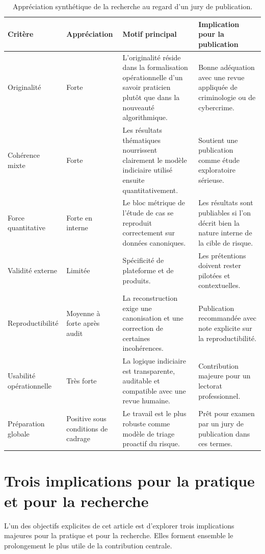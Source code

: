 \documentclass[10pt,a4paper]{article}
\begin{document}
\begin{table}[H]
\centering
\caption{Appréciation synthétique de la recherche au regard d'un jury de publication.}
\begin{tabularx}{\textwidth}{p{2.9cm} p{2.2cm} Y Y}
\toprule
\textbf{Critère} & \textbf{Appréciation} & \textbf{Motif principal} & \textbf{Implication pour la publication} \\
\midrule
Originalité & Forte & L'originalité réside dans la formalisation opérationnelle d'un savoir praticien plutôt que dans la nouveauté algorithmique. & Bonne adéquation avec une revue appliquée de criminologie ou de cybercrime. \\
Cohérence mixte & Forte & Les résultats thématiques nourrissent clairement le modèle indiciaire utilisé ensuite quantitativement. & Soutient une publication comme étude exploratoire sérieuse. \\
Force quantitative & Forte en interne & Le bloc métrique de l'étude de cas se reproduit correctement sur données canoniques. & Les résultats sont publiables si l'on décrit bien la nature interne de la cible de risque. \\
Validité externe & Limitée & Spécificité de plateforme et de produits. & Les prétentions doivent rester pilotées et contextuelles. \\
Reproductibilité & Moyenne à forte après audit & La reconstruction exige une canonisation et une correction de certaines incohérences. & Publication recommandée avec note explicite sur la reproductibilité. \\
Usabilité opérationnelle & Très forte & La logique indiciaire est transparente, auditable et compatible avec une revue humaine. & Contribution majeure pour un lectorat professionnel. \\
Préparation globale & Positive sous conditions de cadrage & Le travail est le plus robuste comme modèle de triage proactif du risque. & Prêt pour examen par un jury de publication dans ces termes. \\
\bottomrule
\end{tabularx}
\end{table}

\section{Trois implications pour la pratique et pour la recherche}
L'un des objectifs explicites de cet article est d'explorer trois implications majeures pour la pratique et pour la recherche. Elles forment ensemble le prolongement le plus utile de la contribution centrale.
\end{document}
